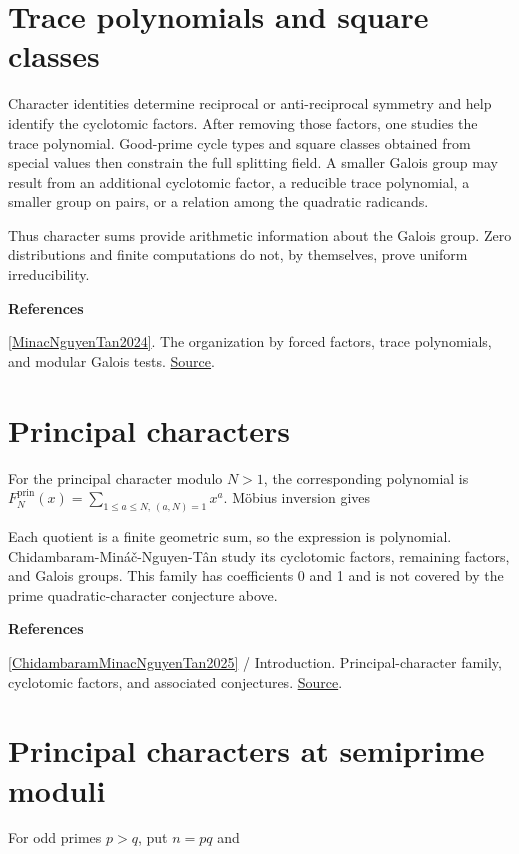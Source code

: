 \documentclass[11pt,a4paper,oneside,openany]{book}
\newcommand{\atlasdisplay}[1]{\par\begingroup\centering\vspace{3pt}\noindent\adjustbox{max width=\linewidth}{\(\displaystyle #1\)}\par\vspace{5pt}\endgroup}
\newenvironment{sources}{\par\smallskip\begingroup\footnotesize\color{atlasgray}\leftskip=10pt\setlength{\parskip}{2pt}}{\par\endgroup\smallskip}
\begin{document}
\section{Trace polynomials and square classes}
\color{black} Character identities determine reciprocal or anti-reciprocal symmetry and help identify the cyclotomic factors. After removing those factors, one studies the trace polynomial. Good-prime cycle types and square classes obtained from special values then constrain the full splitting field. A smaller Galois group may result from an additional cyclotomic factor, a reducible trace polynomial, a smaller group on pairs, or a relation among the quadratic radicands.\par
\color{black} Thus character sums provide arithmetic information about the Galois group. Zero distributions and finite computations do not, by themselves, prove uniform irreducibility.\par
\begin{sources}
\textbf{References}\par\smallskip
\noindent\hyperlink{ref:MinacNguyenTan2024}{[MinacNguyenTan2024]}. The organization by forced factors, trace polynomials, and modular Galois tests. \href{https://arxiv.org/abs/2206.11778}{Source}.\par
\end{sources}\color{black}
\section{Principal characters}
\color{black} For the principal character modulo \(N>1\), the corresponding polynomial is \(F_N^{\mathrm{prin}}(x)=\sum_{1\le a\le N,\,(a,N)=1}x^a\). Möbius inversion gives\par

\atlasdisplay{F_N^{\mathrm{prin}}(x)=\sum_{d\mid N}\mu(d)\,\frac{x^d(1-x^N)}{1-x^d}.}
\color{black} Each quotient is a finite geometric sum, so the expression is polynomial. Chidambaram-Mináč-Nguyen-Tân study its cyclotomic factors, remaining factors, and Galois groups. This family has coefficients 0 and 1 and is not covered by the prime quadratic-character conjecture above.\par
\begin{sources}
\textbf{References}\par\smallskip
\noindent\hyperlink{ref:ChidambaramMinacNguyenTan2025}{[ChidambaramMinacNguyenTan2025]} / Introduction. Principal-character family, cyclotomic factors, and associated conjectures. \href{https://jexpmath.org/index.php/jem/article/view/Vol-1Issue-1Paper-4}{Source}.\par
\end{sources}\color{black}
\section{Principal characters at semiprime moduli}
\color{black} For odd primes \(p>q\), put \(n=pq\) and\par
\end{document}
